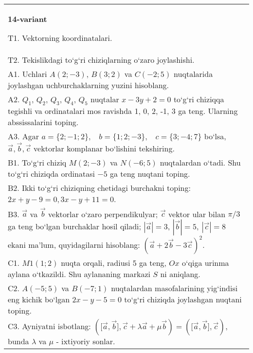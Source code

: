 \documentclass{article}
\begin{document}
\begin{tabular}{m{17cm}}
\textbf{14-variant}
\newline

T1. 
Vektorning koordinatalari.
 \\
T2. 
Tekislikdagi to‘g‘ri chiziqlarning o‘zaro joylashishi.
 \\
A1. 
Uchlari $A (2;-3) $, $B (3;2) $ va $C (-2;5) $
nuqtalarida joylashgan uchburchaklarning yuzini hisoblang.
 \\
A2. 
$Q_1$, $Q_2$, $Q_3$, $Q_4$, $Q_5$ nuqtalar
$x-3y+2=0$ to‘g‘ri chiziqqa tegishli va ordinatalari mos ravishda
1, 0, 2, -1, 3 ga teng. Ularning abssissalarini toping.
 \\
A3. 
Agar \(a = \{ 2; - 1;2\}, \ \ \ \ b = \{ 1;2; - 3\}, \ \ \ \ c = \{ 3; - 4;7\}\) bo‘lsa, $\overrightarrow{a}, \overrightarrow{b}, \overrightarrow{c}$ vektorlar komplanar bo‘lishini tekshiring. \\
B1. 
To‘g‘ri chiziq \(M (2;-3) \) va \(N (-6;5) \) nuqtalardan o‘tadi.
Shu to‘g‘ri chiziqda ordinatasi $-5$ ga teng nuqtani toping.
 \\
B2. 
Ikki to‘g‘ri chiziqning chetidagi burchakni toping: $2x+y-9=0, 3x-y+11=0$.
 \\
B3. 
$\vec{a}$ va $\vec{b}$ vektorlar o‘zaro perpendikulyar; $\vec{c}$ vektor ular bilan $\pi/3$ ga teng bo‘lgan burchaklar hosil qiladi; $|\vec{a}| = 3$, $|\vec{b}| = 5,\ |\vec{c}| = 8$ ekani ma’lum, quyidagilarni hisoblang:
$ (\vec{a} + 2\vec{b} - 3\vec{c}) ^{2}$.
 \\
C1. 
\(M{1} (1; 2) \) nuqta orqali, radiusi 5 ga teng,
$Ox$ o‘qiga urinma aylana o‘tkazildi. Shu aylananing markazi
$S$ ni aniqlang.
 \\
C2. 
\(A (-5;5) \) va \(B (-7;1) \) nuqtalardan
masofalarining yig‘indisi eng kichik bo‘lgan \(2x - y - 5 = 0\) to‘g‘ri chiziqda
joylashgan nuqtani toping.
 \\
C3. 
Ayniyatni isbotlang: \((\lbrack\vec{a},\vec{b}\rbrack,\vec{c} + \lambda\vec{a} + \mu\vec{b}) = (\lbrack\vec{a},\vec{b}\rbrack,\vec{c}) \), bunda \(\lambda\) va \(\mu\) - ixtiyoriy sonlar. \\

\end{tabular}
\vspace{1cm}
\end{document}
